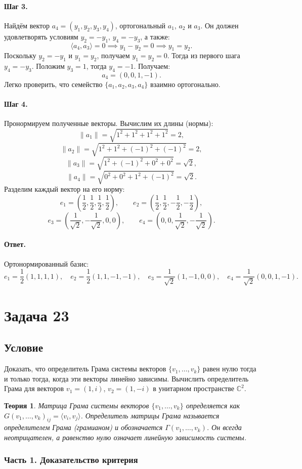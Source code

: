 \documentclass[12pt,a4paper]{article}
\theoremstyle{solution}
\newtheorem*{theory}{Теория}
\newcommand{\task}[1]{\newpage\section*{Задача #1}}
\newcommand{\answer}{\paragraph{Ответ.}}
\newcommand{\step}[1]{\paragraph{Шаг #1.}}
\newcommand{\C}{\mathbb{C}}
\begin{document}
\step{3} Найдём вектор $a_4 = (y_1, y_2, y_3, y_4)$, ортогональный $a_1$, $a_2$ и $a_3$. Он должен удовлетворять условиям $y_2 = -y_1$, $y_4 = -y_3$, а также:
\[
\langle a_4, a_3\rangle = 0 \implies y_1 - y_2 = 0 \implies y_1 = y_2.
\]
Поскольку $y_2 = -y_1$ и $y_1 = y_2$, получаем $y_1 = y_2 = 0$.
Тогда из первого шага $y_4 = -y_3$. Положим $y_3 = 1$, тогда $y_4 = -1$. Получаем:
\[
a_4 = (0, 0, 1, -1).
\]
Легко проверить, что семейство $\{a_1, a_2, a_3, a_4\}$ взаимно ортогонально.

\step{4} Пронормируем полученные векторы. Вычислим их длины (нормы):
\[
\|a_1\| = \sqrt{1^2 + 1^2 + 1^2 + 1^2} = 2,
\]
\[
\|a_2\| = \sqrt{1^2 + 1^2 + (-1)^2 + (-1)^2} = 2,
\]
\[
\|a_3\| = \sqrt{1^2 + (-1)^2 + 0^2 + 0^2} = \sqrt{2},
\]
\[
\|a_4\| = \sqrt{0^2 + 0^2 + 1^2 + (-1)^2} = \sqrt{2}.
\]
Разделим каждый вектор на его норму:
\[
e_1 = \left(\frac{1}{2}, \frac{1}{2}, \frac{1}{2}, \frac{1}{2}\right), \qquad e_2 = \left(\frac{1}{2}, \frac{1}{2}, -\frac{1}{2}, -\frac{1}{2}\right),
\]
\[
e_3 = \left(\frac{1}{\sqrt{2}}, -\frac{1}{\sqrt{2}}, 0, 0\right), \qquad e_4 = \left(0, 0, \frac{1}{\sqrt{2}}, -\frac{1}{\sqrt{2}}\right).
\]

\answer
Ортонормированный базис:
\[
e_1 = \frac{1}{2}(1, 1, 1, 1), \quad e_2 = \frac{1}{2}(1, 1, -1, -1), \quad e_3 = \frac{1}{\sqrt{2}}(1, -1, 0, 0), \quad e_4 = \frac{1}{\sqrt{2}}(0, 0, 1, -1).
\]

\task{23}
\subsection*{Условие}
Доказать, что определитель Грама системы векторов $\{v_1, \ldots, v_k\}$ равен нулю тогда и только тогда, когда эти векторы линейно зависимы. Вычислить определитель Грама для векторов $v_1 = (1, i)$, $v_2 = (1, -i)$ в унитарном пространстве $\C^2$.

\begin{theory}
Матрица Грама системы векторов $\{v_1, \ldots, v_k\}$ определяется как $G(v_1, \ldots, v_k)_{ij} = \langle v_i, v_j\rangle$. Определитель матрицы Грама называется определителем Грама (грамианом) и обозначается $\Gamma(v_1, \ldots, v_k)$. Он всегда неотрицателен, а равенство нулю означает линейную зависимость системы.
\end{theory}

\subsubsection*{Часть 1. Доказательство критерия}
\end{document}
